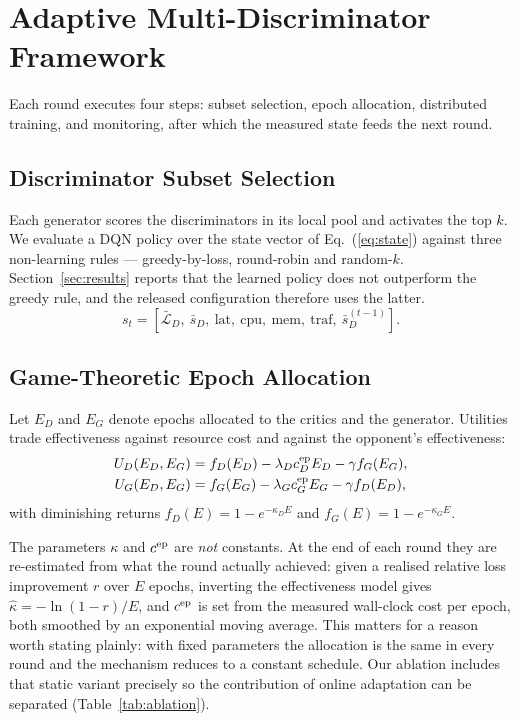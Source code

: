 \documentclass[journal]{IEEEtran}
\begin{document}
\section{Adaptive Multi-Discriminator Framework}
\label{sec:framework}

Each round executes four steps: subset selection, epoch allocation, distributed
training, and monitoring, after which the measured state feeds the next round.

\subsection{Discriminator Subset Selection}
Each generator scores the discriminators in its local pool and activates the top
$k$. We evaluate a DQN policy over the state vector of Eq.~(\ref{eq:state})
against three non-learning rules --- greedy-by-loss, round-robin and random-$k$.
Section~\ref{sec:results} reports that the learned policy does not outperform
the greedy rule, and the released configuration therefore uses the latter.
\begin{equation}
s_t = [\bar{\mathcal{L}}_D,\ \bar{s}_D,\ \text{lat},\ \text{cpu},\
       \text{mem},\ \text{traf},\ \bar{s}^{(t-1)}_D].
\label{eq:state}
\end{equation}

\subsection{Game-Theoretic Epoch Allocation}
Let $E_D$ and $E_G$ denote epochs allocated to the critics and the generator.
Utilities trade effectiveness against resource cost and against the opponent's
effectiveness:
\begin{align}
U_D(E_D,E_G) &= f_D(E_D) - \lambda_D c^{\rm ep}_D E_D - \gamma f_G(E_G),\\
U_G(E_D,E_G) &= f_G(E_G) - \lambda_G c^{\rm ep}_G E_G - \gamma f_D(E_D),
\end{align}
with diminishing returns $f_D(E)=1-e^{-\kappa_D E}$ and
$f_G(E)=1-e^{-\kappa_G E}$.

The parameters $\kappa$ and $c^{\rm ep}$ are \emph{not} constants. At the end of
each round they are re-estimated from what the round actually achieved: given a
realised relative loss improvement $r$ over $E$ epochs, inverting the
effectiveness model gives $\hat{\kappa} = -\ln(1-r)/E$, and $c^{\rm ep}$ is set
from the measured wall-clock cost per epoch, both smoothed by an exponential
moving average. This matters for a reason worth stating plainly: with fixed
parameters the allocation is the same in every round and the mechanism reduces
to a constant schedule. Our ablation includes that static variant precisely so
the contribution of online adaptation can be separated
(Table~\ref{tab:ablation}).
\end{document}
